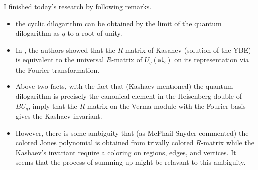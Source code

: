 \documentclass[11pt]{amsart}
\begin{document}
I finished today's research by following remarks.
\begin{itemize}
    \item the cyclic dilogarithm can be obtained by the limit of the quantum dilogarithm as $q$ to a root of unity.
    
    \item In \cite{MM-2001-cJandKashaev}, the authors showed that the $R$-matrix of Kasahev (solution of the YBE) is equivalent to the universal $R$-matrix of $U_q(\mathfrak{sl}_2)$ on its representation via the Fourier transformation.
    
    \item Above two facts, with the fact that (Kashaev mentioned) the quantum dilogarithm is precisely the canonical element in the Heisenberg double of $BU_q$, imply that the $R$-matrix on the Verma module with the Fourier basis gives the Kashaev invariant.
    
    \item However, there is some ambiguity that (as McPhail-Snyder commented) the colored Jones polynomial is obtained from trivally colored $R$-matrix while the Kashaev's invariant require a coloring on regions, edges, and vertices.
    It seems that the process of summing up might be relavant to this ambiguity.
\end{itemize}



\end{document}
